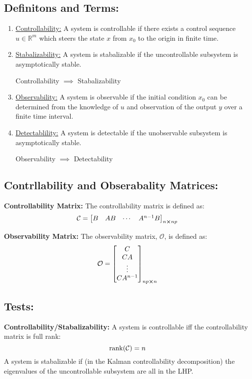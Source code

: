 \documentclass[]{article}
\newcommand{\ctrb}{\mathcal{C}}
\newcommand{\obsv}{\mathcal{O}}
\begin{document}
	\subsection*{Definitons and Terms:}
		\begin{enumerate}
			\item \underline{Controllability:} A system is controllable if there exists a control sequence $u  \in \mathbb{R}^m$ which steers the state $x $ from $x_0$ to the origin in finite time.
			\item \underline{Stabalizability:} A system is stabalizable if the uncontrollable subsystem is asymptotically stable.
				\begin{center}
					Controllability $\implies$ Stabalizability
				\end{center}
			\item \underline{Observability:} A system is observable if the initial condition $x_0$ can be determined from the knowledge of $u$ and observation of the output $y$ over a finite time interval.
			\item \underline{Detectablility:} A system is detectable if the unobservable subsystem is asymptotically stable.
				\begin{center}
					Observability $\implies$ Detectability
				\end{center}
		\end{enumerate}
	

		
	\subsection*{Contrllability and Obserabality Matrices:}
		\textbf{Controllability Matrix:}
		The controllability matrix is defined as:
		\begin{displaymath}
			\ctrb = \mqty[B	&AB	&\cdots	& A^{n-1}B]_{n\cross n p}
		\end{displaymath}
		
		\textbf{Observability Matrix:}
		The observability matrix, $\obsv$, is defined as:
		\begin{displaymath}
			\obsv = \mqty[C\\ CA\\ \vdots\\ C A^{n-1}]_{n p \cross n}
		\end{displaymath}
	
	\subsection*{Tests:}
		\textbf{Controllability/Stabalizability:}
		A system is controllable iff the controllability matrix is full rank:
		\begin{displaymath}
			\rank(\ctrb) = n
		\end{displaymath}
		A system is stabalizable if (in the Kalman controllability decomposition) the eigenvalues of the uncontrollable subsystem are all in the LHP.
		
\end{document}
